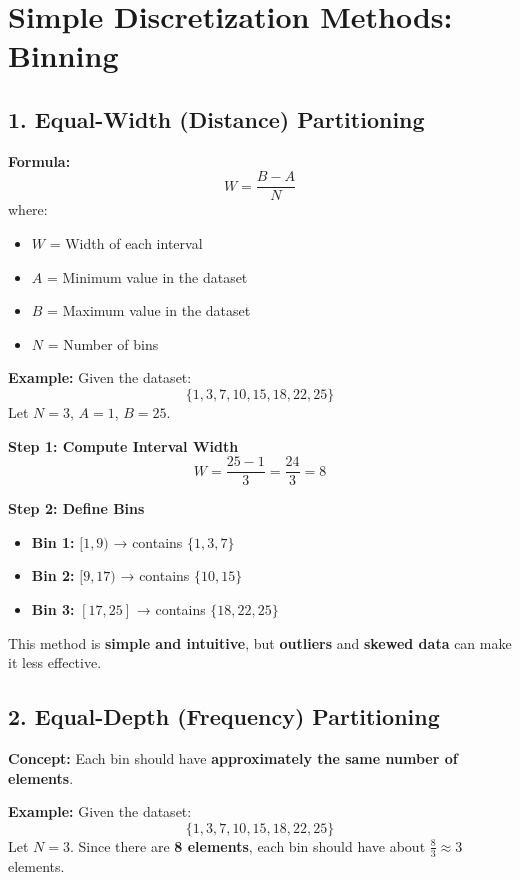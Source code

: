 \documentclass[a4paper,10pt]{article}
\begin{document}
\section*{\centering Simple Discretization Methods: Binning}

\subsection*{1. Equal-Width (Distance) Partitioning}

\textbf{Formula:}
\[
W = \frac{B - A}{N}
\]
where:
\begin{itemize}
    \item \( W \) = Width of each interval  
    \item \( A \) = Minimum value in the dataset  
    \item \( B \) = Maximum value in the dataset  
    \item \( N \) = Number of bins  
\end{itemize}

\textbf{Example:}  
Given the dataset:  
\[
\{1, 3, 7, 10, 15, 18, 22, 25\}
\]
Let \( N = 3 \), \( A = 1 \), \( B = 25 \).

\textbf{Step 1: Compute Interval Width}
\[
W = \frac{25 - 1}{3} = \frac{24}{3} = 8
\]

\textbf{Step 2: Define Bins}
\begin{itemize}
    \item \textbf{Bin 1:} \([1, 9)\) → contains \(\{1, 3, 7\}\)
    \item \textbf{Bin 2:} \([9, 17)\) → contains \(\{10, 15\}\)
    \item \textbf{Bin 3:} \([17, 25]\) → contains \(\{18, 22, 25\}\)
\end{itemize}

This method is \textbf{simple and intuitive}, but \textbf{outliers} and \textbf{skewed data} can make it less effective.

\vspace{0.5cm}

\subsection*{2. Equal-Depth (Frequency) Partitioning}

\textbf{Concept:}  
Each bin should have \textbf{approximately the same number of elements}.

\textbf{Example:}  
Given the dataset:
\[
\{1, 3, 7, 10, 15, 18, 22, 25\}
\]
Let \( N = 3 \). Since there are \textbf{8 elements},  
each bin should have about \(\frac{8}{3} \approx 3\) elements.
\end{document}
